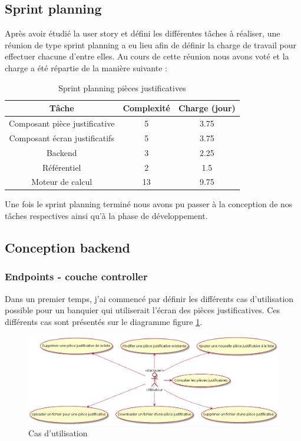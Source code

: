 \subsection{Sprint planning}
	Après avoir étudié la user story et défini les différentes tâches à réaliser, une réunion de type sprint planning a eu lieu afin de définir la charge de travail pour effectuer chacune d'entre elles. Au cours de cette réunion nous avons voté et la charge a été répartie de la manière suivante :
	
\begin{table}[h!]
	\center
	\begin{tabular}{| c | c | c |}
     \hline
     Tâche & Complexité & Charge (jour)\\ \hline
     Composant pièce justificative & 5 & 3.75\\ \hline
     Composant écran justificatifs & 5 & 3.75\\ \hline
     Backend & 3 & 2.25\\ \hline
     Référentiel & 2 & 1.5\\ \hline
     Moteur de calcul & 13 & 9.75\\
     \hline
	\end{tabular}
	\caption{Sprint planning pièces justificatives}
	\label{sprintPlanningPJ}
\end{table}

	Une fois le sprint planning terminé nous avons pu passer à la conception de nos tâches respectives ainsi qu'à la phase de développement.

\subsection{Conception backend}

	\subsubsection{Endpoints - couche controller}

	Dans un premier temps, j'ai commencé par définir les différents cas d'utilisation possible pour un banquier qui utiliserait l'écran des pièces justificatives. Ces différents cas sont présentés sur le diagramme figure \ref{useCasePJ}.

\begin{figure}[h!]
	\includegraphics[scale=0.50]{images/travailBP1818/piecesJustif/useCasePJ.png}
	\centering
	\caption{Cas d'utilisation}
	\label{useCasePJ}
\end{figure}

